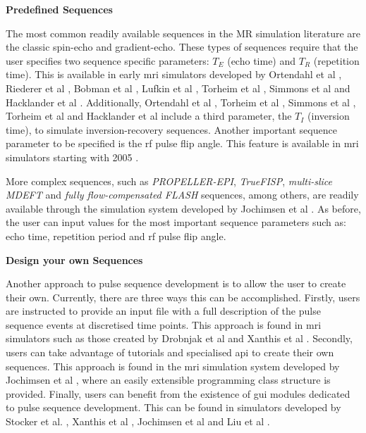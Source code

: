 \hfill

\large \textbf{Predefined Sequences} \normalsize

The most common readily available sequences in the MR simulation literature are the classic spin-echo and gradient-echo.
These types of sequences require that the user specifies two sequence specific parameters: $T_E$ (echo time) and $T_R$ (repetition time).
This is available in early \ac{mri} simulators developed by Ortendahl et al \cite{Ortendahl1984}, Riederer et al \cite{Riederer1984}, Bobman et al \cite{Bobman1985}, Lufkin et al \cite{Lufkin1986}, Torheim et al \cite{Torheim1994}, Simmons et al \cite{Simmons1996} and Hacklander et al \cite{Hacklander2005}.
Additionally, Ortendahl et al \cite{Ortendahl1984}, Torheim et al \cite{Torheim1994}, Simmons et al \cite{Simmons1996}, Torheim et al \cite{Torheim1994} and Hacklander et al \cite{Hacklander2005} include a third parameter, the $T_I$ (inversion time), to simulate inversion-recovery sequences.
Another important sequence parameter to be specified is the \ac{rf} pulse flip angle. 
This feature is available in \ac{mri} simulators starting with 2005 \cite{Benoit-Cattin2005}.

\hfill

More complex sequences, such as \textit{PROPELLER-EPI}, \textit{TrueFISP}, \textit{multi-slice MDEFT} and \textit{fully flow-compensated FLASH} sequences, among others, are readily available through the simulation system developed by Jochimsen et al \cite{Jochimsen2004}.
As before, the user can input values for the most important sequence parameters such as: echo time, repetition period and \ac{rf} pulse flip angle.


\hfill

\large \textbf{Design your own Sequences} \normalsize

Another approach to pulse sequence development is to allow the user to create their own.
Currently, there are three ways this can be accomplished.
Firstly, users are instructed to provide an input file with a full description of the pulse sequence events at discretised time points.
This approach is found in \ac{mri} simulators such as those created by Drobnjak et al \cite{Drobnjak2006} and Xanthis et al \cite{Xanthis2014}.
Secondly, users can take advantage of tutorials and specialised \ac{api} to create their own sequences.
This approach is found in the \ac{mri} simulation system developed by Jochimsen et al \cite{Jochimsen2004}, where an easily extensible programming class structure is provided.
Finally, users can benefit from the existence of \ac{gui} modules dedicated to pulse sequence development.
This can be found in simulators developed by Stocker et al. \cite{Stocker2010}, Xanthis et al \cite{Xanthis2014}, Jochimsen et al \cite{Jochimsen2004} and Liu et al \cite{Liu2013}.

